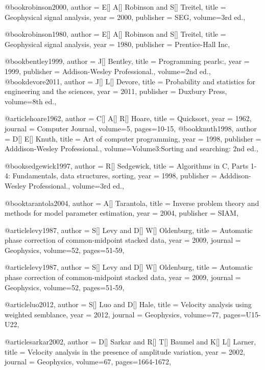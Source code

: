 {@book{robinson2000,
  author =	 {E[] A[] Robinson and S[] Treitel},
  title =	 {Geophysical signal analysis},
  year =	 2000,
  publisher =	 {SEG},
  volume={3rd ed.},
}

@book{robinson1980,
  author =	 {E[] A[] Robinson and S[] Treitel},
  title =	 {Geophysical signal analysis},
  year =	 1980,
  publisher =	 {Prentice-Hall Inc},
}

@book{bentley1999,
  author =	 {J[] Bentley},
  title =	 {Programming pearls:},
  year =	 1999,
  publisher =	 {Addison-Wesley Professional.},
  volume={2nd ed.},
}
@book{devore2011,
  author =	 {J[] L[] Devore},
  title =	 {Probability and statistics for engineering and the sciences},
  year =	 2011,
  publisher =	 {Duxbury Press},
  volume={8th ed.},
}

@article{hoare1962,
  author =	 {C[] A[] R[] Hoare},
  title =	 {Quicksort},
  year =	 1962,
  journal =	 {Computer Journal},
  volume={5},
 pages=10-15,
}
@book{knuth1998,
  author =	 {D[] E[] Knuth},
  title =	 {Art of computer programming},
  year =	 1998,
  publisher =	 { Adddison-Wesley Professional.},
  volume={Volume3:Sorting and searching: 2nd ed.},
}

@book{sedgewick1997,
  author =	 {R[] Sedgewick},
  title =	 {Algorithms in C, Parts 1-4: Fundamentals, data structures, sorting},
  year =	 1998,
  publisher =	 { Adddison-Wesley Professional.},
  volume={3rd ed.},
}

@book{tarantola2004,
  author =	 {A[] Tarantola},
  title =	 {Inverse problem theory and methods for model parameter estimation},
  year =	 2004,
  publisher =	 { SIAM},
}

@article{levy1987,
  author =	 {S[] Levy and D[] W[] Oldenburg},
  title =	 {Automatic phase correction of common-midpoint stacked data},
  year =	 2009,
  journal =	 {Geophysics},
  volume={52},
 pages=51-59,
}

@article{levy1987,
  author =	 {S[] Levy and D[] W[] Oldenburg},
  title =	 {Automatic phase correction of common-midpoint stacked data},
  year =	 2009,
  journal =	 {Geophysics},
  volume={52},
 pages=51-59,
}

@article{luo2012,
  author =	 {S[] Luo and D[] Hale},
  title =	 {Velocity analysis using weighted semblance},
  year =	 2012,
  journal =	 {Geophysics},
  volume={77},
 pages=U15-U22,
}

@article{sarkar2002,
  author =	 {D[] Sarkar and R[] T[] Baumel and K[] L[] Larner},
  title =	 {Velocity analysis in the presence of amplitude variation},
  year =	 2002,
  journal =	 {Geophysics},
  volume={67},
  pages=1664-1672,
}

}
